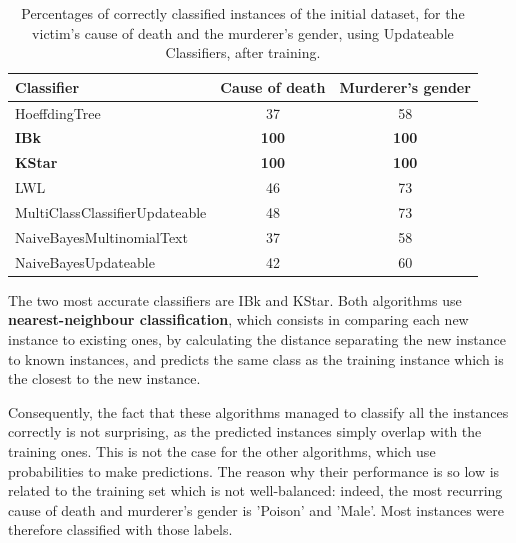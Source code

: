 \documentclass{mproj}
\begin{document}
\begin{table}[h]
	\centering
	\caption{Percentages of correctly classified instances of the initial dataset, for the victim's cause of death and the murderer's gender, using Updateable Classifiers, after training.}
	\begin{tabular}{ |l|c|c| }
		\hline
		\textbf{Classifier}            & \textbf{Cause of death} 					 & \textbf{Murderer's gender} 					  \\
		\hline		
		HoeffdingTree                  & 37                                          & 58                                             \\
		\textbf{IBk}                   & \textbf{100}                                & \textbf{100}                                   \\
		\textbf{KStar}                 & \textbf{100}                                & \textbf{100}                                   \\
		LWL                            & 46                                          & 73                                             \\
		MultiClassClassifierUpdateable & 48                                          & 73                                             \\
		NaiveBayesMultinomialText      & 37                                          & 58                                             \\
		NaiveBayesUpdateable           & 42                                          & 60                                             \\
		\hline
	\end{tabular}
	\label{tab:updateable}
\end{table}

The two most accurate classifiers are IBk and KStar. Both algorithms use \textbf{nearest-neighbour classification}, which consists in comparing each new instance to existing ones, by calculating the distance separating the new instance to known instances, and predicts the same class as the training instance which is the closest to the new instance. \cite[Chapter~3]{wekabook} 

Consequently, the fact that these algorithms managed to classify all the instances correctly is not surprising, as the predicted instances simply overlap with the training ones. This is not the case for the other algorithms, which use probabilities to make predictions. The reason why their performance is so low is related to the training set which is not well-balanced: indeed, the most recurring cause of death and murderer's gender is 'Poison' and 'Male'. Most instances were therefore classified with those labels.
\end{document}
